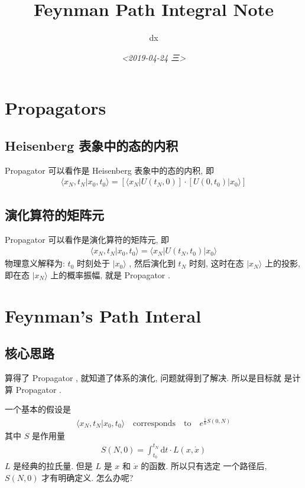 \documentclass[11pt]{article}
\author{dx}
\date{\textit{<2019-04-24 三>}}
\title{Feynman Path Integral Note}
\begin{document}
\maketitle
\tableofcontents


\section{Propagators}
\label{sec:org3aa55a3}

\subsection{Heisenberg 表象中的态的内积}
\label{sec:org0b97df2}

Propagator 可以看作是 Heisenberg 表象中的态的内积, 即
\begin{align}
  \langle x_N, t_N | x_0 , t_0 \rangle
  = [\langle x_N | U(t_N, 0)]
   \cdot[ U(0,t_0)| x_0 \rangle]
\end{align}

\subsection{演化算符的矩阵元}
\label{sec:org25150d6}

Propagator 可以看作是演化算符的矩阵元, 即
\begin{align}
  \langle x_N, t_N | x_0 , t_0 \rangle
  = \langle x_N | U(t_N, t_0) | x_0 \rangle
\end{align}
物理意义解释为: \(t_0\) 时刻处于 \(|x_0\rangle\) , 然后演化到 \(t_N\) 时刻,
这时在态 \(| x_N\rangle\) 上的投影, 即在态 \(| x_N\rangle\) 上的概率振幅,
就是 Propagator .

\section{Feynman's Path Interal}
\label{sec:orgea5d2bf}

\subsection{核心思路}
\label{sec:org198f3e3}

算得了 Propagator , 就知道了体系的演化, 问题就得到了解决. 所以是目标就
是计算 Propagator .

一个基本的假设是
\begin{align}
    \langle x_N, t_N | x_0 , t_0 \rangle \quad \mathrm{corresponds\quad to }
  \quad e^{\frac{\mathrm{i}}{\hbar}S(0,N)}
\end{align}
其中 \(S\) 是作用量
\begin{align}
  S(N,0) =
   \int_{t_0}^{t_N}\mathrm{d}t \cdot L(x, \dot{x}) 
\end{align}
\(L\) 是经典的拉氏量. 但是 \(L\) 是 \(x\) 和 \(\dot{x}\) 的函数. 所以只有选定
一个路径后, \(S(N,0)\) 才有明确定义. 怎么办呢?
\end{document}
